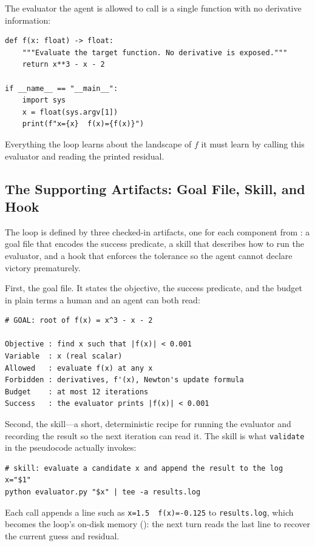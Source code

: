 The evaluator the agent is allowed to call is a single function with no
derivative information:

\begin{verbatim}
def f(x: float) -> float:
    """Evaluate the target function. No derivative is exposed."""
    return x**3 - x - 2

if __name__ == "__main__":
    import sys
    x = float(sys.argv[1])
    print(f"x={x}  f(x)={f(x)}")
\end{verbatim}

Everything the loop learns about the landscape of $f$ it must learn by calling
this evaluator and reading the printed residual.

\subsection{The Supporting Artifacts: Goal File, Skill, and Hook}\label{subsec:rootfind-artifacts}

The loop is defined by three checked-in artifacts, one for each component from
: a goal file that encodes the success predicate, a skill
that describes how to run the evaluator, and a hook that enforces the tolerance so
the agent cannot declare victory prematurely.

First, the goal file. It states the objective, the success predicate, and the
budget in plain terms a human and an agent can both read:

\begin{verbatim}
# GOAL: root of f(x) = x^3 - x - 2

Objective : find x such that |f(x)| < 0.001
Variable  : x (real scalar)
Allowed   : evaluate f(x) at any x
Forbidden : derivatives, f'(x), Newton's update formula
Budget    : at most 12 iterations
Success   : the evaluator prints |f(x)| < 0.001
\end{verbatim}

Second, the skill---a short, deterministic recipe for running the evaluator and
recording the result so the next iteration can read it. The skill is what
\texttt{validate} in the pseudocode actually invokes:

\begin{verbatim}
# skill: evaluate a candidate x and append the result to the log
x="$1"
python evaluator.py "$x" | tee -a results.log
\end{verbatim}

Each call appends a line such as \texttt{x=1.5\ \ f(x)=-0.125} to
\texttt{results.log}, which becomes the loop's on-disk memory
(): the next turn reads the last line to recover
the current guess and residual.

